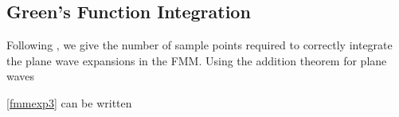 %
%
%
%
%
%
%
%

\subsection{Green's Function Integration}

Following \cite{yucel2008helmholtz}, we give the number of sample points required to correctly integrate the plane wave expansions in the FMM. Using the addition theorem for plane waves 

\eqref{fmmexp3} can be written 

